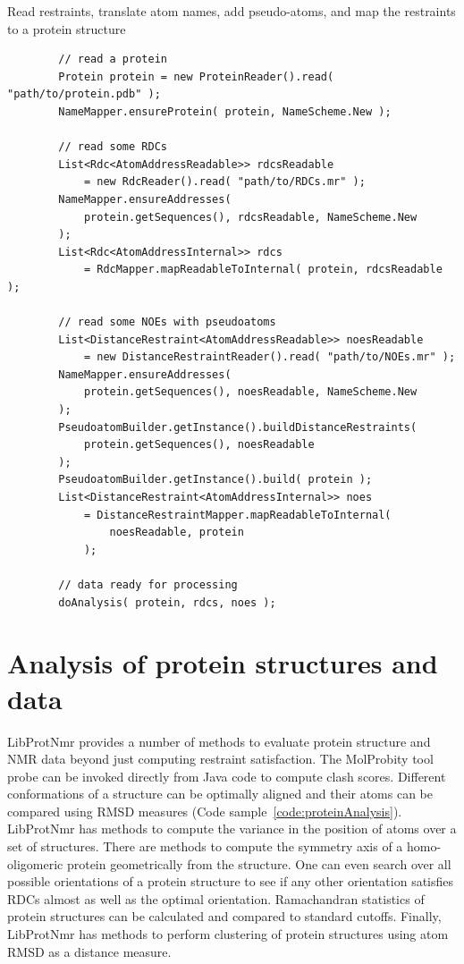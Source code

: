\documentclass[11pt]{article}
\newcommand{\software}[1]{{\sc #1}}
\newcommand{\coderef}[1]{Code sample~\ref{#1}}
\newenvironment{codesample}
{
\begin{codesamplefloat}
\centering
\RecustomVerbatimEnvironment{Verbatim}{BVerbatim}{}
\vspace{0.1in}
}{
\end{codesamplefloat}
}
\newcommand{\libprotnmr}{\software{LibProtNmr}}
\begin{document}
\begin{codesample}
	\caption{
		Read restraints, translate atom names, add pseudo-atoms, and map the restraints to a protein structure
	}
	\begin{verbatim}
		// read a protein
		Protein protein = new ProteinReader().read( "path/to/protein.pdb" );
		NameMapper.ensureProtein( protein, NameScheme.New );
		
		// read some RDCs
		List<Rdc<AtomAddressReadable>> rdcsReadable
			= new RdcReader().read( "path/to/RDCs.mr" );
		NameMapper.ensureAddresses(
			protein.getSequences(), rdcsReadable, NameScheme.New
		);
		List<Rdc<AtomAddressInternal>> rdcs
			= RdcMapper.mapReadableToInternal( protein, rdcsReadable );
		
		// read some NOEs with pseudoatoms
		List<DistanceRestraint<AtomAddressReadable>> noesReadable
			= new DistanceRestraintReader().read( "path/to/NOEs.mr" );
		NameMapper.ensureAddresses(
			protein.getSequences(), noesReadable, NameScheme.New
		);
		PseudoatomBuilder.getInstance().buildDistanceRestraints(
			protein.getSequences(), noesReadable
		);
		PseudoatomBuilder.getInstance().build( protein );
		List<DistanceRestraint<AtomAddressInternal>> noes
			= DistanceRestraintMapper.mapReadableToInternal(
				noesReadable, protein
			);
			
		// data ready for processing
		doAnalysis( protein, rdcs, noes );
	\end{verbatim}
	\label{code:nmrPrep}
\end{codesample}


\section{Analysis of protein structures and data}

{\libprotnmr} provides a number of methods to evaluate protein structure and NMR data beyond just computing restraint satisfaction. The MolProbity tool \software{probe} can be invoked directly from Java code to compute clash scores. Different conformations of a structure can be optimally aligned and their atoms can be compared using RMSD measures (\coderef{code:proteinAnalysis}). {\libprotnmr} has methods to compute the variance in the position of atoms over a set of structures. There are methods to compute the symmetry axis of a homo-oligomeric protein geometrically from the structure. One can even search over all possible orientations of a protein structure to see if any other orientation satisfies RDCs almost as well as the optimal orientation. Ramachandran statistics of protein structures can be calculated and compared to standard cutoffs. Finally, {\libprotnmr} has methods to perform clustering of protein structures using atom RMSD as a distance measure.
\end{document}
